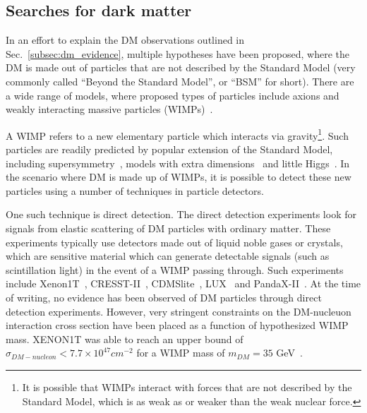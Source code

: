 \subsection{Searches for dark matter}

In an effort to explain the DM observations outlined in Sec.~\ref{subsec:dm_evidence},
multiple hypotheses have been proposed, where the DM is made out of particles that are not
described by the Standard Model (very commonly called ``Beyond the Standard Model'', or ``BSM'' for short).
There are a wide range of models, where proposed types of particles include axions and weakly interacting 
massive particles (WIMPs)~\cite{Profumo:2017hqp}.


A WIMP refers to a new elementary particle which interacts via gravity\footnote{It is possible that WIMPs interact
with forces that are not described by the Standard Model, which is as weak as or weaker than the weak nuclear force.}.
Such particles are readily predicted by popular extension of the Standard Model, including 
supersymmetry~\cite{Jungman:1995df}, models with extra dimensions~\cite{Dienes:1998vh}  
and little Higgs~\cite{Arkani-Hamed:2002ikv}. In the scenario where DM is made up of WIMPs, it is possible to
detect these new particles using a number of techniques in particle detectors. 

One such technique is direct detection. The direct detection experiments look for signals from elastic scattering of DM
particles with ordinary matter. These experiments typically use detectors made out of liquid noble gases or crystals,
which are sensitive material which can generate detectable signals (such as scintillation light) in the event of a WIMP
passing through.
Such experiments include Xenon1T~\cite{XENON:2017vdw}, CRESST-II~\cite{Angloher:2011uu},
CDMSlite~\cite{SuperCDMS:2017nns}, LUX~\cite{LUX:2015abn} and PandaX-II~\cite{PandaX-II:2016vec}. At the time of writing,
no evidence has been observed of DM particles through direct detection experiments. However, very stringent constraints
on the DM-nucleuon interaction cross section have been placed as a function of hypothesized WIMP mass. XENON1T was able
to reach an upper bound of $\sigma_{DM-nucleon} < 7.7 \times 10^{47} cm^{-2}$ for a WIMP mass of $m_{DM} = 35$
GeV~\cite{XENON:2017vdw}.

